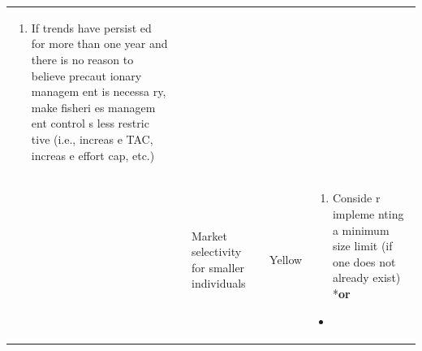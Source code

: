 \documentclass[]{book}
\providecommand{\tightlist}{%
  \setlength{\itemsep}{0pt}\setlength{\parskip}{0pt}}
\begin{document}
\begin{longtable}[]{@{}lllll@{}}
\begin{minipage}[t]{0.19\columnwidth}
\begin{enumerate}
\def\labelenumi{\arabic{enumi}.}
\setcounter{enumi}{1}
\tightlist
\item
  If trends have persist ed for more than one year and there is no
  reason to believe precaut ionary managem ent is necessa ry, make
  fisheri es managem ent control s less restric tive (i.e., increas e
  TAC, increas e effort cap, etc.)
\end{enumerate}\strut
\end{minipage}\tabularnewline
\begin{minipage}[t]{0.19\columnwidth}\raggedright\strut
\strut
\end{minipage} & \begin{minipage}[t]{0.19\columnwidth}\raggedright\strut
\strut
\end{minipage} & \begin{minipage}[t]{0.19\columnwidth}\raggedright\strut
Market selectivity for smaller individuals\strut
\end{minipage} & \begin{minipage}[t]{0.19\columnwidth}\raggedright\strut
Yellow\strut
\end{minipage} & \begin{minipage}[t]{0.19\columnwidth}\raggedright\strut
\begin{enumerate}
\def\labelenumi{\arabic{enumi}.}
\tightlist
\item
  Conside r impleme nting a minimum size limit (if one does not already
  exist) *\textbf{or}
\end{enumerate}

\begin{itemize}
\item
\end{itemize}


\end{minipage}
\end{longtable}
\end{document}
